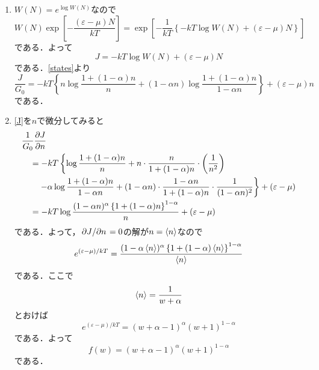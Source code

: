 \documentclass[a4paper,pdflatex,ja=standard]{bxjsarticle}
\begin{document}
\begin{enumerate}
  \item 
  $W(N)=e^{\log W(N)}$なので
  \begin{equation}
    W(N)\exp\left[ -\frac{(\varepsilon-\mu)N}{kT} \right]
    =
    \exp\left[  
      -\frac{1}{kT}\left\{  
        -kT\log W(N)+(\varepsilon-\mu)N
      \right\}
    \right]
  \end{equation}
  である．よって
  \begin{equation}
    J
    =
    -kT\log W(N)+(\varepsilon-\mu)N
  \end{equation}
  である．\eqref{states}より
  \begin{equation}
    \frac{J}{G_{0}}
    =
    -kT
    \left\{  
      n\log\frac{1+(1-\alpha)n}{n}
    +
    (1-\alpha n)\log\frac{1+(1-\alpha)n}{1-\alpha n}
    \right\}
    +(\varepsilon-\mu)n
    \label{J}
  \end{equation}
  である．

  \item 
  \eqref{J}を$n$で微分してみると
  \begin{align}
    &
    \frac{1}{G_{0}}\pdv{J}{n}
    \nonumber
    \\
    &\hspace{10pt}
    =
    -kT
    \left\{  
      \log\frac{1+(1-\alpha)n}{n}
      +
      n
      \cdot
      \frac{n}{1+(1-\alpha)n}
      \cdot
      \left( \frac{1}{n^2} \right)
    \right.
    \nonumber
    \\
    &\hspace{20pt}
    \left.
      -
      \alpha
      \log\frac{1+(1-\alpha)n}{1-\alpha n}
      +
      (1-\alpha n)
      \cdot
      \frac{1-\alpha n}{1+(1-\alpha)n}
      \cdot
      \frac{1}{(1-\alpha n)^2}
    \right\}
    +
    (\varepsilon-\mu)
    \nonumber
    \\
    &\hspace{10pt}
    =
    -kT
    \log \frac{(1-\alpha n)^\alpha \left\{ 1+(1-\alpha)n \right\}^{1-\alpha}}{n}
    +
    (\varepsilon-\mu)
  \end{align}
  である．よって，$\pdv*{J}{n}=0$の解が$n=\ev{n}$なので
  \begin{equation}
    e^{(\varepsilon-\mu)/kT}
    =
    \frac{(1-\alpha \ev{n})^\alpha \left\{ 1+(1-\alpha)\ev{n} \right\}^{1-\alpha}}{\ev{n}}
  \end{equation}
  である．ここで
  \begin{equation}
    \ev{n}
    =
    \frac{1}{w+\alpha}
  \end{equation}
  とおけば
  \begin{equation}
    e^{(\varepsilon-\mu)/kT}
    =
    (w+\alpha-1)^{\alpha} (w+1)^{1-\alpha}
    \label{dist}
  \end{equation}
  である．よって
  \begin{equation}
    f(w)
    =
    (w+\alpha-1)^{\alpha}(w+1)^{1-\alpha}
  \end{equation}
  である．


\end{enumerate}
\end{document}
